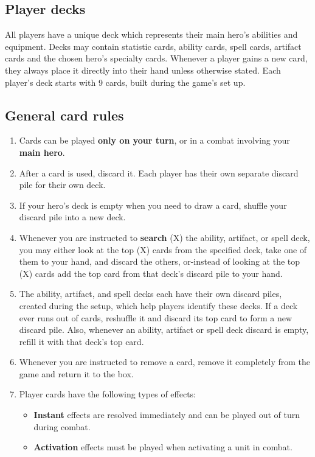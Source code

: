 \documentclass[12pt]{article}
\begin{document}
\clearpage
\subsection*{\hypertarget{Playerdecks}{Player decks}}
All players have a unique deck which represents their main hero's abilities and equipment. Decks may contain statistic cards, ability cards, spell cards, artifact cards and the chosen hero’s specialty cards. Whenever a player gains a new card, they always place it directly into their hand unless otherwise stated. Each player’s deck starts with 9 cards, built during the game’s set up.
\subsection*{General card rules}
\begin{enumerate}
	\item Cards can be played \textbf{only on your turn}, or in a combat involving your \textbf{main hero}.
	\item After a card is used, discard it. Each player has their own separate discard pile for their own deck.
	\item If your hero's deck is empty when you need to draw a card, shuffle your discard pile into a new deck.
    \item Whenever you are instructed to \textbf{search} (X) the ability, artifact, or spell deck, you may either look at the top (X) cards from the specified deck, take one of them to your hand, and discard the others, or-instead of looking at the top (X) cards add the top card from that deck’s discard pile to your hand.
    \item The ability, artifact, and spell decks each have their own discard piles, created during the setup, which help players identify these decks. If a deck ever runs out of cards, reshuffle it and discard its top card to form a new discard pile. Also, whenever an ability, artifact or spell deck discard is empty, refill it with that deck’s top card.
    \item Whenever you are instructed to remove a card, remove it completely from the game and return it to the box.
    \item Player cards have the following types of effects:
    \begin{itemize}
        \item \textbf{Instant}  effects are resolved immediately and can be played out of turn during combat.
        \item \textbf{Activation}  effects must be played when activating a unit in combat.

\end{itemize}
\end{enumerate}
\end{document}
